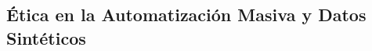 \begin{refsection}
\chapter{Ética en la Automatización Masiva y Datos Sintéticos}
\label{chapter:chapter-17}

\begin{comment}
\begin{enumerate}
\item \textbf{Ética en la Automatización Masiva y Datos Sintéticos (Capítulo 17):}  
\begin{itemize}
    \item Impacto de la automatización masiva en empleos globales.
    \item Propuestas para la renta básica universal y reentrenamiento masivo.
    \item Actividad: Diseñar un sistema predictivo para identificar empleos en riesgo.
\end{itemize}
\end{enumerate}
\end{comment}


\nocite{*}

\printbibliography[heading=subbibliography, title={Bibliografía del Capítulo 17}]
\end{refsection}
